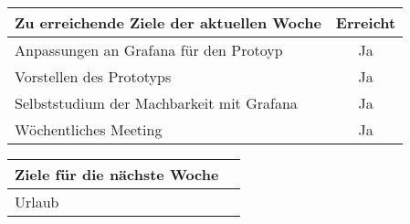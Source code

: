\begin{tabularx}{\textwidth}{Xc}
    \arrayrulecolor{OliveGreen}
    \toprule
    {\bfseries Zu erreichende Ziele der aktuellen Woche} & {\bfseries Erreicht} \\
    \midrule[2pt]
    Anpassungen an Grafana für den Protoyp               &Ja                 \\
    \rowcolor{OliveGreen!15}
    Vorstellen des Prototyps                             &Ja                 \\
    \rowcolor{White}
    Selbststudium der Machbarkeit mit Grafana            &Ja                 \\
    \rowcolor{OliveGreen!15}
    Wöchentliches Meeting                                &Ja                 \\
   \bottomrule[2pt]
\end{tabularx}
%
\vspace{1cm}
%
\begin{tabularx}{\textwidth}{Xc}
    \arrayrulecolor{OliveGreen}
    \toprule
    {\bfseries Ziele für die nächste Woche}              &                   \\
    \midrule[2pt]
    Urlaub                                               &                   \\
\end{tabularx}
